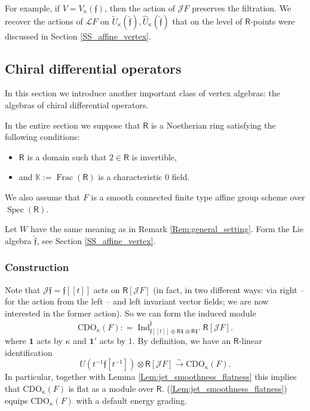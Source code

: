 \documentclass{amsart}
\theoremstyle{definition}
\newcommand{\Ring}{\mathsf{R}}
\newcommand{\Jet}{\mathscr{J}}
\newcommand{\Loop}{\mathscr{L}}
\newcommand{\K}{\mathbb{K}}
\newcommand{\ff}{\mathfrak{f}}
\newcommand{\CDO}{\mathrm{CDO}}
\numberwithin{equation}{section}
\begin{document}
For example, if $V=V_\kappa(\ff)$, then the action of $\Jet F$ preserves the filtration. 
We recover the actions of $\Loop F$ on $\widetilde{U}_\kappa(\hat{\ff}), \widehat{U}_\kappa(\hat{\ff})$ that on the level of $\Ring$-points were discussed in Section 
\ref{SS_affine_vertex}.

\subsection{Chiral differential operators} \label{ss:defcdo}
In this section we introduce another important class of vertex algebras: the algebras of chiral differential operators. 

In the entire section we suppose that $\Ring$ is a Noetherian ring satisfying the following conditions:
\begin{itemize}
\item $\Ring$ is a domain such that $2\in \Ring$ is invertible,
\item and $\K:=\operatorname{Frac}(\Ring)$ is a characteristic $0$ field. 
\end{itemize}
We also assume that $F$ is a smooth connected finite type affine group scheme over $\operatorname{Spec}(\Ring)$.

Let $W$ have the same meaning as in Remark \ref{Rem:general_setting}.
Form the Lie algebra $\hat{\mathfrak{f}}$, see Section \ref{SS_affine_vertex}.

\subsubsection{Construction}\label{SSS_CDO_construction}
%
Note that $\Jet\mathfrak{f} = \mathfrak{f}[[t]]$ acts on $\Ring[\Jet F]$ (in fact, in two different ways: via right -- for the action from the left -- and left invariant vector fields; we are now interested in the former action). So we can form the induced module
\[
\CDO_\kappa(F): = \operatorname{Ind}_{\mathfrak{f}[[t]]\oplus \Ring\mathbf{1}\oplus \Ring\mathbf{1}'}^{\hat{\mathfrak{f}}} \Ring[\Jet F].
\]
where $\mathbf{1}$ acts by $\kappa$ and $\mathbf{1}'$ acts by $1$. By definition, we have an $\Ring$-linear identification 
\begin{equation}\label{eq:CDO_CDO_decomposition}
U(t^{-1}\mathfrak{f}[t^{-1}])\otimes \Ring[\Jet F]\xrightarrow{\sim} \CDO_\kappa(F).
\end{equation}
In particular, together with Lemma \ref{Lem:jet_smoothness_flatness} this implies that $\CDO_\kappa(F)$ is flat as a module over $\Ring$. (\ref{Lem:jet_smoothness_flatness}) equips $\CDO_\kappa(F)$ with a default energy grading. 
\end{document}

